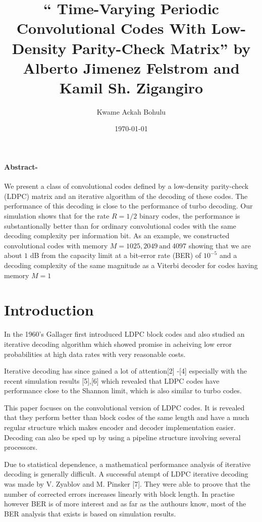 \documentclass[11pt, oneside, dvipdfmx]{book}
\title{``
Time-Varying Periodic Convolutional Codes With Low-Density Parity-Check Matrix'' by 
Alberto Jimenez Felstrom and
Kamil Sh. Zigangiro}
\author{Kwame Ackah Bohulu}
\date{\today}
\begin{document}
\maketitle

\paragraph{Abstract-}
We present a class of convolutional codes defined by a low-density parity-check (LDPC) matrix and an iterative algorithm of the decoding of
these codes. The performance of this decoding is close to the performance
of turbo decoding. Our simulation shows that for the rate $R = 1/2$
binary codes, the performance is substantionally better than for ordinary
convolutional codes with the same decoding complexity per information
bit. As an example, we constructed convolutional codes with memory
$M = 1025, 2049 ~\text{and} ~4097$ showing that we are about $1$ dB from
the capacity limit at a bit-error rate (BER) of $10^{-5}$ and a decoding
complexity of the same magnitude as a Viterbi decoder for codes having
memory $M = 1$


\section{Introduction}
In the 1960's Gallager first introduced LDPC block codes and also studied an iterative decoding algorithm which showed promise in acheiving low error probabilities at high data rates with very reasonable costs.

Iterative decoding has since gained a lot of attention[2] -[4] especially with the recent simulation results [5],[6] which revealed that LDPC codes have performance close to the Shannon limit, which is also similar to turbo codes.

This paper focuses on the convolutional version of LDPC codes. It is revealed that they perform better than block codes of the same length and have a much regular structure which makes encoder and decoder implementation easier. Decoding can also be sped up by using a pipeline structure involving several processors.

Due to statistical dependence, a mathematical performance analysis of iterative decoding is generally difficult. A successful atempt of LDPC iterative decoding was made by V. Zyablov and M. Pinsker [7]. They were able to proove that the number of corrected errors increases linearly with block length. In practise however BER is of more interest and as far as the authours know, most of the BER analysis that exists is based on simulation results.
\end{document}
